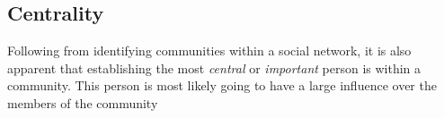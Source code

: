 \subsection{Centrality}
Following from identifying communities within a social network, it is also apparent that establishing the most \emph{central} or \emph{important} person is within a community. This person is most likely going to have a large influence over the members of the community 

\subsubsection{}